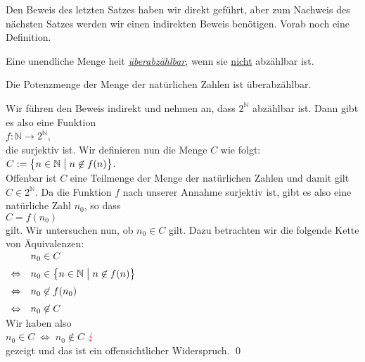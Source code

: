 Den Beweis des letzten Satzes haben wir direkt gef\"{u}hrt, aber zum Nachweis des n\"{a}chsten Satzes werden wir
einen indirekten Beweis ben\"{o}tigen.  Vorab noch eine Definition.

\begin{Definition} \lb
Eine unendliche Menge hei\3t
\href{https://en.wikipedia.org/wiki/Uncountable_set}{\emph{\"{u}berabz\"{a}hlbar}}, wenn sie
\underline{nicht} abz\"{a}hlbar ist. 
\end{Definition}

\begin{Satz}
  Die Potenzmenge der Menge der nat\"{u}rlichen Zahlen ist \"{u}berabz\"{a}hlbar.
\end{Satz}

\proof
Wir f\"{u}hren den Beweis indirekt und nehmen an, dass $2^{\mathbb{N}}$ abz\"{a}hlbar ist.  Dann gibt es also
eine Funktion
\\[0.2cm]
\hspace*{1.3cm}
$f: \mathbb{N} \rightarrow 2^{\mathbb{N}}$,
\\[0.2cm]
die surjektiv ist.  Wir definieren nun die Menge $C$ wie folgt:
\\[0.2cm]
\hspace*{1.3cm}
$C := \bigl\{ n \in \mathbb{N} \bigm| n \not\in f(n) \bigr\}$.
\\[0.2cm]
Offenbar ist $C$ eine Teilmenge der Menge der nat\"{u}rlichen Zahlen und damit gilt $C \in 2^{\mathbb{N}}$.
Da die Funktion $f$ nach unserer Annahme surjektiv ist, gibt es also eine nat\"{u}rliche Zahl $n_0$, so
dass 
\\[0.2cm]
\hspace*{1.3cm}
$C = f(n_0)$
\\[0.2cm]
gilt.  Wir untersuchen nun, ob $n_0 \in C$ gilt.  Dazu betrachten wir die folgende Kette von
\"{A}quivalenzen: 
\\[0.2cm]
\hspace*{1.3cm}
$
\begin{array}[t]{cl}
                & n_0 \in C                                                      \\[0.2cm]
\Leftrightarrow & n_0 \in \bigl\{ n \in \mathbb{N} \bigm| n \not\in f(n) \bigr\} \\[0.2cm]
\Leftrightarrow & n_0 \not\in f(n_0)                                             \\[0.2cm]
\Leftrightarrow & n_0 \not\in C                                               
\end{array}
$
\\[0.2cm]
Wir haben also
\\[0.2cm]
\hspace*{1.3cm}
$n_0 \in C \;\Leftrightarrow\; n_0 \not\in C$ \quad \mbox{$\color{red}{\lightning}$}
\\[0.2cm]
gezeigt und das ist ein offensichtlicher Widerspruch. \qed

